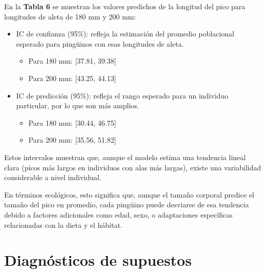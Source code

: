 \documentclass[
  spanish,
  11pt,
  a4paper,
  DIV=11,
  numbers=noendperiod]{scrartcl}
\providecommand{\tightlist}{%
  \setlength{\itemsep}{0pt}\setlength{\parskip}{0pt}}
\begin{document}
En la \textbf{Tabla 6} se muestran los valores predichos de la longitud
del pico para longitudes de aleta de 180 mm y 200 mm:

\begin{itemize}
\tightlist
\item
  IC de confianza (95\%): refleja la estimación del promedio poblacional
  esperado para pingüinos con esas longitudes de aleta.

  \begin{itemize}
  \tightlist
  \item
    Para 180 mm: {[}37.81, 39.38{]}
  \item
    Para 200 mm: {[}43.25, 44.13{]}
  \end{itemize}
\item
  IC de predicción (95\%): refleja el rango esperado para un individuo
  particular, por lo que son más amplios.

  \begin{itemize}
  \tightlist
  \item
    Para 180 mm: {[}30.44, 46.75{]}
  \item
    Para 200 mm: {[}35.56, 51.82{]}
  \end{itemize}
\end{itemize}

Estos intervalos muestran que, aunque el modelo estima una tendencia
lineal clara (picos más largos en individuos con alas más largas),
existe una variabilidad considerable a nivel individual.

En términos ecológicos, esto significa que, aunque el tamaño corporal
predice el tamaño del pico en promedio, cada pingüino puede desviarse de
esa tendencia debido a factores adicionales como edad, sexo, o
adaptaciones específicas relacionadas con la dieta y el hábitat.

\section{Diagnósticos de supuestos}\label{diagnuxf3sticos-de-supuestos}
\end{document}
